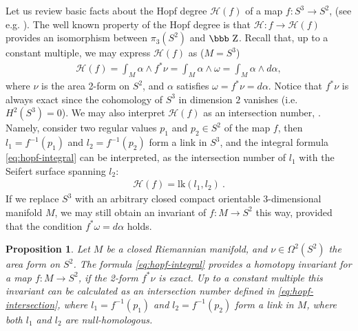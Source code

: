 \documentclass[12pt]{article}
\newtheorem{proposition}[theorem]{Proposition}
\newcommand{\Z}{\mbox{\bbb Z}}
\begin{document}
Let us review basic facts about the Hopf degree $\mathscr{H}(f)$ of a map 
$f:S^3\longrightarrow S^2$, (see
e.g. \cite{Bott82}). The well known property of the Hopf degree is that  $\mathscr{H}: f\longrightarrow \mathscr{H}(f)$ provides an isomorphism between $\pi_3(S^2)$
and $\Z$. Recall that, up to a constant multiple, we
may express $\mathscr{H}(f)$ as ($M=S^3$)
\begin{gather}\label{eq:hopf-integral}
\mathscr{H}(f)= \int_{M} \alpha\wedge f^\ast\nu=\int_{M} \alpha\wedge \omega=\int_{M} \alpha\wedge d\alpha,
\end{gather}
where $\nu$ is the area 2-form on $S^2$, and $\alpha$ satisfies
$\omega=f^\ast\nu=d\alpha$. Notice that $f^\ast\nu$ is always exact
since the cohomology of $S^3$ in dimension $2$ vanishes (i.e.
$H^2(S^3)=0$). We may also interpret $\mathscr{H}(f)$ as an intersection number,
\cite{Bott82, Milnor97}. Namely, consider two regular values $p_1$ and $p_2\in S^2$ of the map $f$,
then $l_1=f^{-1}(p_1)$ and $l_2=f^{-1}(p_2)$ form a link in $S^3$, and the integral formula
\eqref{eq:hopf-integral} can be interpreted, as the intersection number of $l_1$ with the Seifert surface spanning $l_2$:
\begin{gather}\label{eq:hopf-intersection}
\mathscr{H}(f)=\text{lk}(l_1,l_2)\ .
\end{gather}
If we replace $S^3$ with an arbitrary closed
compact orientable 3-dimensional manifold $M$, we may still obtain
an invariant of $f:M\longrightarrow S^2$ this way, provided that
the condition $f^\ast\omega=d\alpha$ holds. 

\begin{proposition}\label{th:hopf-degree-general}
 Let $M$ be a closed Riemannian manifold, and $\nu\in \Omega^2(S^2)$ the area form on $S^2$.
 The formula \eqref{eq:hopf-integral} provides a homotopy invariant 
 for a map $f:M\longrightarrow S^2$, if the 2-form $f^\ast\nu$ is exact. Up to a constant multiple 
 this invariant can be calculated as an intersection number defined in \eqref{eq:hopf-intersection},
 where $l_1=f^{-1}(p_1)$ and $l_2=f^{-1}(p_2)$ form a link in $M$, where both $l_1$ and $l_2$ are null-homologous.
\end{proposition}
\end{document}
